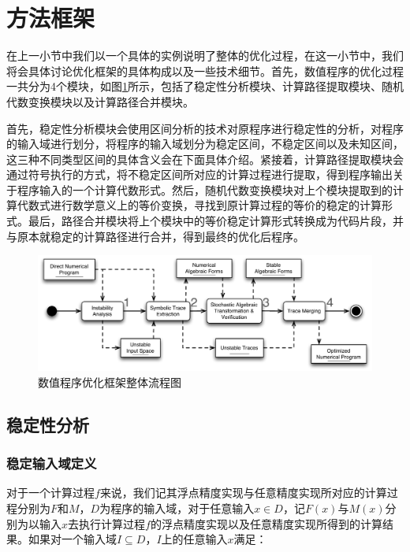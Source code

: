 \section{方法框架}

在上一小节中我们以一个具体的实例说明了整体的优化过程，在这一小节中，我们将会具体讨论优化框架的具体构成以及一些技术细节。首先，数值程序的优化过程一共分为4个模块，如图\ref{fig:mainframe}所示，包括了稳定性分析模块、计算路径提取模块、随机代数变换模块以及计算路径合并模块。

首先，稳定性分析模块会使用区间分析的技术对原程序进行稳定性的分析，对程序的输入域进行划分，将程序的输入域划分为稳定区间，不稳定区间以及未知区间，这三种不同类型区间的具体含义会在下面具体介绍。紧接着，计算路径提取模块会通过符号执行的方式，将不稳定区间所对应的计算过程进行提取，得到程序输出关于程序输入的一个计算代数形式。然后，随机代数变换模块对上个模块提取到的计算代数式进行数学意义上的等价变换，寻找到原计算过程的等价的稳定的计算形式。最后，路径合并模块将上个模块中的等价稳定计算形式转换成为代码片段，并与原本就稳定的计算路径进行合并，得到最终的优化后程序。

\begin{figure}[thbp]
  \centering
 \includegraphics[width=\textwidth]{fig/MainFramework.pdf}
  \caption{数值程序优化框架整体流程图} \label{fig:mainframe}
\end{figure}

\subsection{稳定性分析}

\subsubsection{稳定输入域定义}
对于一个计算过程$f$来说，我们记其浮点精度实现与任意精度实现所对应的计算过程分别为$F$和$M$，$D$为程序的输入域，对于任意输入$x \in D$，记$F(x)$与$M(x)$分别为以输入$x$去执行计算过程$f$的浮点精度实现以及任意精度实现所得到的计算结果。如果对一个输入域$I \subseteq D$，$I$上的任意输入$x$满足：


